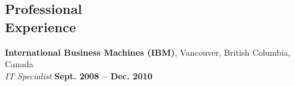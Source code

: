 \documentclass[margin,line,letterpaper]{resume}
\begin{document}
\begin{resume}
    \section{\mysidestyle Professional\\Experience}

    \textbf{International Business Machines (IBM)}, Vancouver, British Columbia, Canada
\vspace{2mm}\\\vspace{1mm}%
    \textsl{IT Specialist} \hfill \textbf{Sept. 2008 -- Dec. 2010}





\end{resume}
\end{document}
